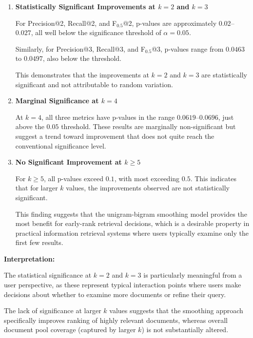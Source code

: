 \begin{enumerate}
    \item \textbf{Statistically Significant Improvements at $k=2$ and $k=3$}
    
    For Precision@2, Recall@2, and F$_{0.5}$@2, p-values are approximately $0.02$--$0.027$, all well below the significance threshold of $\alpha = 0.05$.
    
    Similarly, for Precision@3, Recall@3, and F$_{0.5}$@3, p-values range from $0.0463$ to $0.0497$, also below the threshold.
    
    This demonstrates that the improvements at $k=2$ and $k=3$ are statistically significant and not attributable to random variation.
    
    \item \textbf{Marginal Significance at $k=4$}
    
    At $k=4$, all three metrics have p-values in the range $0.0619$--$0.0696$, just above the $0.05$ threshold. These results are marginally non-significant but suggest a trend toward improvement that does not quite reach the conventional significance level.
    
    \item \textbf{No Significant Improvement at $k \geq 5$}
    
    For $k \geq 5$, all p-values exceed $0.1$, with most exceeding $0.5$. This indicates that for larger $k$ values, the improvements observed are not statistically significant.
    
    This finding suggests that the unigram-bigram smoothing model provides the most benefit for early-rank retrieval decisions, which is a desirable property in practical information retrieval systems where users typically examine only the first few results.
\end{enumerate}

\vspace{0.2cm}

\textbf{Interpretation:}

The statistical significance at $k=2$ and $k=3$ is particularly meaningful from a user perspective, as these represent typical interaction points where users make decisions about whether to examine more documents or refine their query. 

The lack of significance at larger $k$ values suggests that the smoothing approach specifically improves ranking of highly relevant documents, whereas overall document pool coverage (captured by larger $k$) is not substantially altered.

